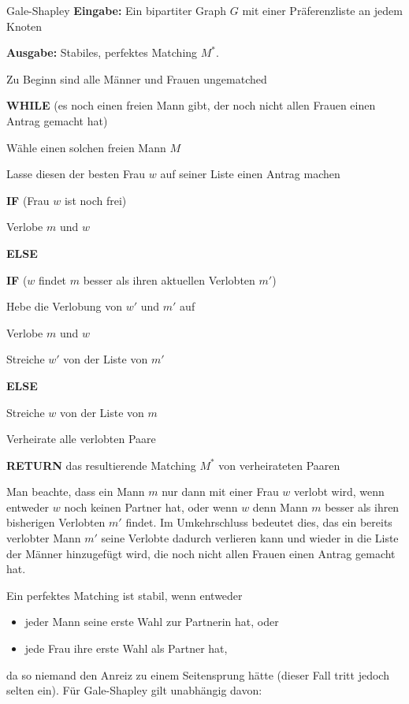 \documentclass{panikzettel}
\newcommand\tab[1][1cm]{\hspace*{#1}}
\begin{document}
\begin{algo}{Gale-Shapley}
	\textbf{Eingabe:} Ein bipartiter Graph $G$ mit einer Präferenzliste an jedem Knoten
	
	\textbf{Ausgabe:} Stabiles, perfektes Matching $M^*$.
	\tcblower
	
	Zu Beginn sind alle Männer und Frauen ungematched
	
	\textbf{WHILE} (es noch einen freien Mann gibt, der noch nicht allen Frauen einen Antrag gemacht hat)
	
	\tab Wähle einen solchen freien Mann $M$
	
	\tab Lasse diesen der besten Frau $w$ auf seiner Liste einen Antrag machen
	
	\tab \textbf{IF} (Frau $w$ ist noch frei)
	
	\tab\tab Verlobe $m$ und $w$
	
	\tab \textbf{ELSE} 
	
	\tab\tab  \textbf{IF} ($w$ findet $m$ besser als ihren aktuellen Verlobten $m'$)
	
	\tab\tab\tab Hebe die Verlobung von $w'$ und $m'$ auf
	
	\tab\tab\tab Verlobe $m$ und $w$
	
	\tab\tab\tab Streiche $w'$ von der Liste von $m'$
	
	\tab\tab \textbf{ELSE}
	
	\tab\tab\tab Streiche $w$ von der Liste von $m$
	
	Verheirate alle verlobten Paare
	
	\textbf{RETURN} das resultierende Matching $M^*$ von verheirateten Paaren
\end{algo}

Man beachte, dass ein Mann $m$ nur dann mit einer Frau $w$ verlobt wird, wenn entweder $w$ noch keinen Partner hat, oder wenn $w$ denn Mann $m$ besser als ihren bisherigen Verlobten $m'$ findet. Im Umkehrschluss bedeutet dies, das ein bereits verlobter Mann $m'$ seine Verlobte dadurch verlieren kann und wieder in die Liste der Männer hinzugefügt wird, die noch nicht allen Frauen einen Antrag gemacht hat. 

Ein perfektes Matching ist stabil, wenn entweder 
\begin{itemize}
	\item jeder Mann seine erste Wahl zur Partnerin hat, oder
	\item jede Frau ihre erste Wahl als Partner hat,
\end{itemize}
da so niemand den Anreiz zu einem Seitensprung hätte (dieser Fall tritt jedoch selten ein). Für Gale-Shapley gilt unabhängig davon: 
\end{document}

